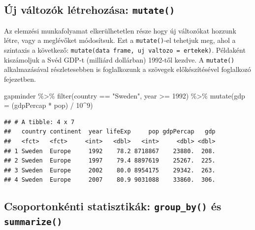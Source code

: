 \documentclass[
]{book}
\newenvironment{Shaded}{\begin{snugshade}}{\end{snugshade}}
\newcommand{\AttributeTok}[1]{\textcolor[rgb]{0.77,0.63,0.00}{#1}}
\newcommand{\DecValTok}[1]{\textcolor[rgb]{0.00,0.00,0.81}{#1}}
\newcommand{\FunctionTok}[1]{\textcolor[rgb]{0.00,0.00,0.00}{#1}}
\newcommand{\NormalTok}[1]{#1}
\newcommand{\SpecialCharTok}[1]{\textcolor[rgb]{0.00,0.00,0.00}{#1}}
\newcommand{\StringTok}[1]{\textcolor[rgb]{0.31,0.60,0.02}{#1}}
\begin{document}
\hypertarget{uxfaj-vuxe1ltozuxf3k-luxe9trehozuxe1sa-mutate}{%
\subsection{\texorpdfstring{Új változók létrehozása:
\texttt{mutate()}}{Új változók létrehozása: mutate()}}\label{uxfaj-vuxe1ltozuxf3k-luxe9trehozuxe1sa-mutate}}

Az elemzési munkafolyamat elkerülhetetlen része hogy új változókat
hozzunk létre, vagy a meglévőket módosítsuk. Ezt a \texttt{mutate()}-el
tehetjuk meg, ahol a szintaxis a következő:
\texttt{mutate(data\ frame,\ uj\ valtozo\ =\ ertekek)}. Példaként
kiszámoljuk a Svéd GDP-t (milliárd dollárban) 1992-től kezdve. A
\texttt{mutate()} alkalmazásával részletesebben is foglalkozunk a
szövegek előkészítésével foglalkozó fejezetben.

\begin{Shaded}
\begin{Highlighting}[]
\NormalTok{gapminder }\SpecialCharTok{\%\textgreater{}\%} 
  \FunctionTok{filter}\NormalTok{(country }\SpecialCharTok{==} \StringTok{"Sweden"}\NormalTok{, year }\SpecialCharTok{\textgreater{}=} \DecValTok{1992}\NormalTok{) }\SpecialCharTok{\%\textgreater{}\%} 
  \FunctionTok{mutate}\NormalTok{(}\AttributeTok{gdp =}\NormalTok{ (gdpPercap }\SpecialCharTok{*}\NormalTok{ pop) }\SpecialCharTok{/} \DecValTok{10}\SpecialCharTok{\^{}}\DecValTok{9}\NormalTok{)}
\end{Highlighting}
\end{Shaded}

\begin{verbatim}
## # A tibble: 4 x 7
##   country continent  year lifeExp     pop gdpPercap   gdp
##   <fct>   <fct>     <int>   <dbl>   <int>     <dbl> <dbl>
## 1 Sweden  Europe     1992    78.2 8718867    23880.  208.
## 2 Sweden  Europe     1997    79.4 8897619    25267.  225.
## 3 Sweden  Europe     2002    80.0 8954175    29342.  263.
## 4 Sweden  Europe     2007    80.9 9031088    33860.  306.
\end{verbatim}

\hypertarget{csoportonkuxe9nti-statisztikuxe1k-group_by-uxe9s-summarize}{%
\subsection{\texorpdfstring{Csoportonkénti statisztikák:
\texttt{group\_by()} és
\texttt{summarize()}}{Csoportonkénti statisztikák: group\_by() és summarize()}}\label{csoportonkuxe9nti-statisztikuxe1k-group_by-uxe9s-summarize}}
\end{document}
